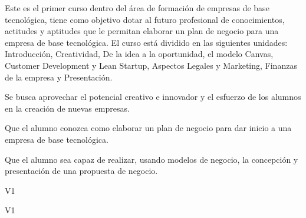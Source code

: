 \begin{syllabus}


\begin{justification}
Este es el primer curso dentro del área de formación de empresas de
base tecnológica, tiene como objetivo dotar al futuro profesional 
de conocimientos, actitudes y aptitudes que le
permitan elaborar un plan de negocio para una empresa de base tecnológica.
El curso está dividido en las siguientes unidades:
Introducción, Creatividad, De la idea a la oportunidad, el modelo Canvas, Customer Development y Lean Startup, Aspectos Legales y Marketing, Finanzas de la empresa y Presentación.

Se busca aprovechar el potencial creativo e innovador y el esfuerzo de los alumnos en la creación de nuevas empresas.
\end{justification}

\begin{goals}
\item Que el alumno conozca como elaborar un plan de negocio para dar inicio a una empresa de base tecnológica.
\item Que el alumno sea capaz de realizar, usando modelos de negocio, la concepción y presentación de una propuesta de negocio.
\end{goals}

\begin{outcomes}{V1}
    \item {}
    \item {}
    \item {}
    \item {}
    \item {}
\end{outcomes}

\begin{competences}{V1}
    \item {} %
    \item {} %
    \item {}
    \item {}
    \item {}
    \item {}
    \item {}
    \item {}
    

\end{competences}
\end{syllabus}
